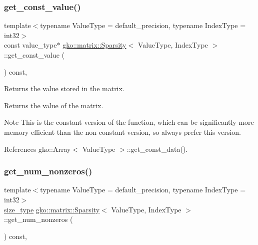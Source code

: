 \mbox{\label{classgko_1_1matrix_1_1Sparsity_a9314f4505be2d592b40527cd63ea4c08}} 
\subsubsection{\texorpdfstring{get\+\_\+const\+\_\+value()}{get\_const\_value()}}
{\footnotesize\ttfamily template$<$typename Value\+Type  = default\+\_\+precision, typename Index\+Type  = int32$>$ \\
const value\+\_\+type$\ast$ \hyperlink{classgko_1_1matrix_1_1Sparsity}{gko\+::matrix\+::\+Sparsity}$<$ Value\+Type, Index\+Type $>$\+::get\+\_\+const\+\_\+value (\begin{DoxyParamCaption}{ }\end{DoxyParamCaption}) const\hspace{0.3cm}{\ttfamily [inline]}, {\ttfamily [noexcept]}}



Returns the value stored in the matrix. 

\begin{DoxyReturn}{Returns}
the value of the matrix.
\end{DoxyReturn}
\begin{DoxyNote}{Note}
This is the constant version of the function, which can be significantly more memory efficient than the non-\/constant version, so always prefer this version. 
\end{DoxyNote}


References gko\+::\+Array$<$ Value\+Type $>$\+::get\+\_\+const\+\_\+data().

\mbox{\label{classgko_1_1matrix_1_1Sparsity_a72d5dd5f1860ac6d312ef7f0f68c403f}} 
\subsubsection{\texorpdfstring{get\+\_\+num\+\_\+nonzeros()}{get\_num\_nonzeros()}}
{\footnotesize\ttfamily template$<$typename Value\+Type  = default\+\_\+precision, typename Index\+Type  = int32$>$ \\
\hyperlink{namespacegko_a6e5c95df0ae4e47aab2f604a22d98ee7}{size\+\_\+type} \hyperlink{classgko_1_1matrix_1_1Sparsity}{gko\+::matrix\+::\+Sparsity}$<$ Value\+Type, Index\+Type $>$\+::get\+\_\+num\+\_\+nonzeros (\begin{DoxyParamCaption}{ }\end{DoxyParamCaption}) const\hspace{0.3cm}{\ttfamily [inline]}, {\ttfamily [noexcept]}}



